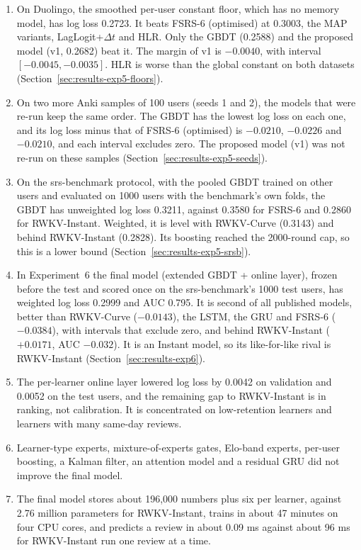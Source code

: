 \begin{enumerate}
  \item On Duolingo, the smoothed per-user constant floor, which has no memory model, has log loss 0.2723. It beats FSRS-6 (optimised) at 0.3003, the MAP variants, LagLogit+$\Delta t$ and HLR. Only the GBDT (0.2588) and the proposed model (v1, 0.2682) beat it. The margin of v1 is $-0.0040$, with interval $[-0.0045, -0.0035]$. HLR is worse than the global constant on both datasets (Section~\ref{sec:results-exp5-floors}).
  \item On two more Anki samples of 100 users (seeds 1 and 2), the models that were re-run keep the same order. The GBDT has the lowest log loss on each one, and its log loss minus that of FSRS-6 (optimised) is $-0.0210$, $-0.0226$ and $-0.0210$, and each interval excludes zero. The proposed model (v1) was not re-run on these samples (Section~\ref{sec:results-exp5-seeds}).
  \item On the srs-benchmark protocol, with the pooled GBDT trained on other users and evaluated on 1000 users with the benchmark's own folds, the GBDT has unweighted log loss 0.3211, against 0.3580 for FSRS-6 and 0.2860 for RWKV-Instant. Weighted, it is level with RWKV-Curve (0.3143) and behind RWKV-Instant (0.2828). Its boosting reached the 2000-round cap, so this is a lower bound (Section~\ref{sec:results-exp5-srsb}).
  \item In Experiment~6 the final model (extended GBDT + online layer), frozen before the test and scored once on the srs-benchmark's 1000 test users, has weighted log loss 0.2999 and AUC 0.795. It is second of all published models, better than RWKV-Curve ($-0.0143$), the LSTM, the GRU and FSRS-6 ($-0.0384$), with intervals that exclude zero, and behind RWKV-Instant ($+0.0171$, AUC $-0.032$). It is an Instant model, so its like-for-like rival is RWKV-Instant (Section~\ref{sec:results-exp6}).
  \item The per-learner online layer lowered log loss by 0.0042 on validation and 0.0052 on the test users, and the remaining gap to RWKV-Instant is in ranking, not calibration. It is concentrated on low-retention learners and learners with many same-day reviews.
  \item Learner-type experts, mixture-of-experts gates, Elo-band experts, per-user boosting, a Kalman filter, an attention model and a residual GRU did not improve the final model.
  \item The final model stores about 196,000 numbers plus six per learner, against 2.76 million parameters for RWKV-Instant, trains in about 47 minutes on four CPU cores, and predicts a review in about 0.09 ms against about 96 ms for RWKV-Instant run one review at a time.
\end{enumerate}
